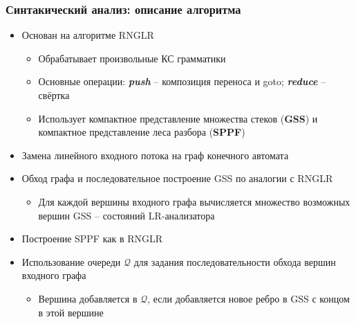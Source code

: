 \documentclass{beamer}
\begin{document}
\begin{frame}
    \transwipe[direction=90]
    \frametitle{Синтакический анализ: описание алгоритма}
    \begin{itemize}         
        \item Основан на алгоритме RNGLR
        \begin{itemize}         
           \item Обрабатывает произвольные КС грамматики
           \item Основные операции: {\bfseries{\textit{push}}} -- композиция переноса и goto; {\bfseries{\textit{reduce}}} -- свёртка
           \item Использует компактное представление множества стеков ({\bfseries GSS}) и компактное представление леса разбора ({\bfseries SPPF})
        \end{itemize}
        \item Замена линейного входного потока на граф конечного автомата
        \item Обход графа и последовательное построение GSS по аналогии с RNGLR
            \begin{itemize}         
                \item Для каждой вершины входного графа вычисляется множество возможных вершин GSS -- состояний LR-анализатора
            \end{itemize}
        \item Построение SPPF как в RNGLR
        \item Использование очереди $\mathcal Q$ для задания последовательности обхода вершин 
        входного графа
            \begin{itemize}         
                \item Вершина добавляется в $\mathcal Q$, если добавляется новое ребро в GSS с концом в этой вершине
            \end{itemize}
    \end{itemize}
\end{frame}
\end{document}
